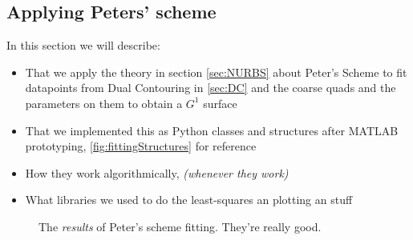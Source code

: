 \subsection{Applying Peters' scheme}
In this section we will describe:
\begin{itemize}
\item That we apply the theory in section \autoref{sec:NURBS} about Peter's Scheme to fit datapoints from Dual Contouring in \autoref{sec:DC} and the coarse quads and the parameters on them to obtain a $G^1$ surface
\item That we implemented this as Python classes and structures after MATLAB prototyping, \autoref{fig:fittingStructures} for reference
\item How they work algorithmically, \textit{(whenever they work)}
\item What libraries we used to do the least-squares an plotting an stuff
\end{itemize}

\begin{figure}
\label{fig:fittingStructures}
\caption{The \emph{results} of Peter's scheme fitting. They're really good.}
\end{figure}